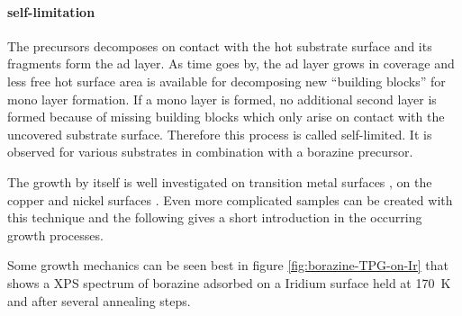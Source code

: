 \paragraph{self-limitation}
The precursors decomposes on contact with the hot substrate surface and its fragments form the ad layer. As time goes by, the ad layer grows in coverage and less free hot surface area is available for decomposing new ``building blocks'' for mono layer formation. If a mono layer is formed, no additional second layer is formed because of missing building blocks which only arise on contact with the uncovered substrate surface. Therefore this process is called self-limited. It is observed \cite{corso_h-bn_2005, cavar_single_2008, muller_epitaxial_2010} for various substrates in combination with a borazine precursor.

%

%

The growth by itself is well investigated on transition metal surfaces \cite{gomez_diaz_hexagonal_2013,morscher_formation_2006}, on the copper and nickel surfaces \cite{preobrajenski_monolayer_2005,joshi_boron_2012}. Even more complicated samples can be created with this technique \cite{roth_chemical_2013} and the following gives a short introduction in the occurring growth processes.

Some growth mechanics can be seen best in figure \ref{fig:borazine-TPG-on-Ir} that shows a XPS spectrum of borazine adsorbed on a Iridium surface held at \SI{170}{\kelvin} and after several annealing steps. 

